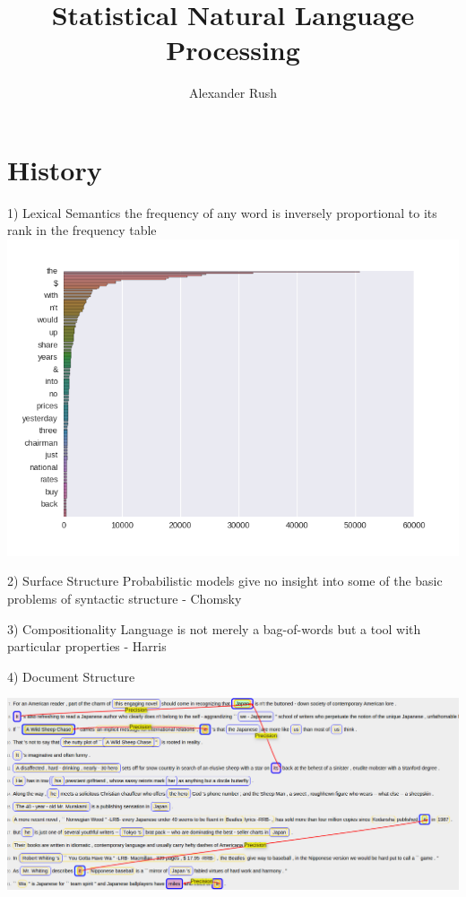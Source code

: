 \documentclass{beamer}
\title{Statistical Natural Language Processing}
\author{Alexander Rush}
\begin{document}
\begin{frame}
  \titlepage
\end{frame}


\section{History}

\begin{frame}
  
\end{frame}

\begin{frame}{1) Lexical Semantics}
  the frequency of any word is inversely proportional to its rank in the frequency table
  \hspace*{-1cm} \includegraphics[width=1.2\textwidth]{../notebooks/zipf}  
\end{frame}

\begin{frame}{2) Surface Structure}
  Probabilistic models give no insight into some of the basic problems of syntactic structure -
  Chomsky

  
\end{frame}

\begin{frame}{3) Compositionality}
Language is not merely a bag-of-words but a tool with particular properties - Harris  
\end{frame}

\begin{frame}{4) Document Structure}
  \begin{center}
    \includegraphics[width=\textwidth]{cort}
  \end{center}
\end{frame}
\end{document}
